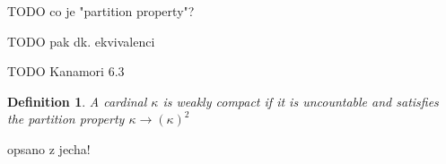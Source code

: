 \documentclass[12pt,a4paper]{article}
\newtheorem{theorem}{Theorem}[section]
\newtheorem{definition}[theorem]{Definition}
\newtheorem{lemma}[theorem]{Lemma}
\newenvironment{proof}
{\noindent \textit{Proof.}}
{\hspace*{\fill} $\Box$}
\newcommand{\then}{\rightarrow}
\begin{document}
TODO co je "partition property"?

TODO pak dk. ekvivalenci

TODO Kanamori 6.3

\begin{definition}
A cardinal $\kappa$ is \emph{weakly compact} if it is uncountable and satisfies the partition property $\kappa \then (\kappa)^2$
\end{definition}
{\color{red}
opsano z jecha!
\begin{comment}

\begin{lemma}
Every weakly compact cardinal is inaccessible
\end{lemma}

\begin{proof}
Let $\kappa$ b a~weakly compact cardinal. To show that $\kappa$ is regular, let us assume that $\kappa$ i the disjoint union
$\bigcup\{A_{\gamma}: \gamma < \lambda\}$ such that $\lambda < \kappa$ and $|A_{\gamma}| < \kappa$ for each $\gamma < \lambda$.
 We define a~partition $F: [\kappa]^2 \then \{0, 1\}$ as follows: $F(\{\alpha, \beta\}) = 0$ just in cas $\alpha$ and $\beta$ are the same size $A_{\gamma}$. Obviously, this partition does not have a~homogenous set $H \subset \kappa$ of size $\kappa$.
That $\kappa$ is a~strong limit cardinal follows from Lemma 9.4: (?? doplnit z jecha): If $\kappa \geq 2^{\lambda}$ for some $\lambda < \kappa$,
the because $2^{\lambda} \leq (\lambda^{+})^2$, we have $\kappa \leq (\lambda^{+})^2$ and hence $\kappa \leq (\kappa)^2$.
\end{proof}

\

\end{comment}
}

{\color{red}
\begin{comment}


\begin{theorem}\label{th:refl_weakly_compact}
Let $\kappa$ be a~weakly compact cardinal. Then for every stationary set $S \subset \kappa$ there is an uncountable regular cardinal $\lambda < \kappa$ such that the set $S \cap \lambda$ is stationary in $\lambda$.
\end{theorem}
\begin{proof}
TODO
\end{proof}

\


\begin{definition}[Indescribability]
For Q either $\Pi^m_n$ or $\Sigma^m_n$\newline
A cardinal $\kappa$ is \emph{$Q-indescribable$} if whenever
$U \subseteq V_\kappa$ and $\varphi$ is a~Q sentence such that $\langle V_\kappa, \in, U \rangle \models \varphi$, then for some $\alpha < \kappa$, $\langle V_\alpha, \in, U \cap V_\alpha \rangle \models \varphi$.
\end{definition}

\end{comment}
}
\end{document}
